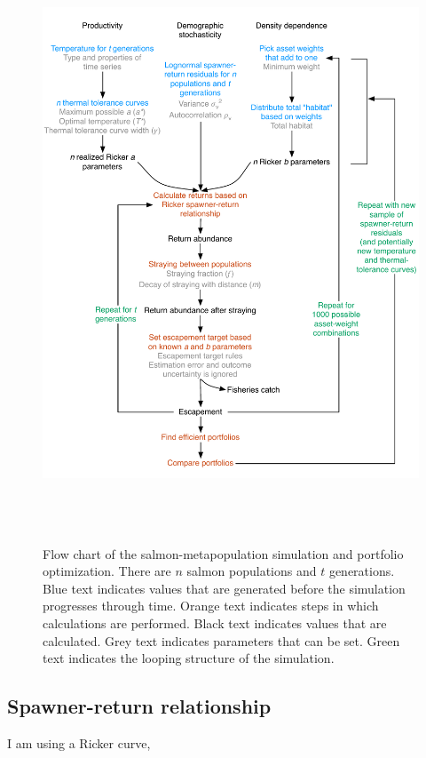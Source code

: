 \documentclass[12pt]{article}
\begin{document}
\begin{figure}[htbp]
  \centering
    \includegraphics[height=7in]{simulation_diagram.pdf}
 \caption{Flow chart of the salmon-metapopulation simulation and portfolio optimization. There are $n$ salmon populations and $t$ generations. Blue text indicates values that are generated before the simulation progresses through time. Orange text indicates steps in which calculations are performed. Black text indicates values that are calculated. Grey text indicates parameters that can be set. Green text indicates the looping structure of the simulation.}
  \label{fig:sim-diagram}
\end{figure}

\subsection{Spawner-return relationship}

I am using a Ricker curve,
\end{document}
